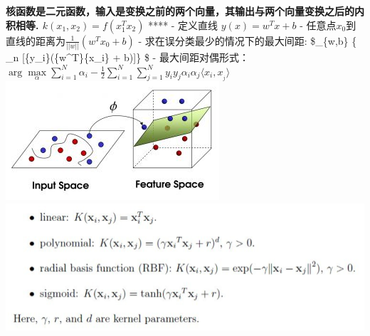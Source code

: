 \documentclass[11pt]{article}
\makeatletter
\def\maxwidth{\ifdim\Gin@nat@width>\linewidth\linewidth
    \else\Gin@nat@width\fi}
\let\Oldincludegraphics\includegraphics
\renewcommand{\includegraphics}[1]{\Oldincludegraphics[width=.8\maxwidth]{#1}}
\makeatother
\begin{document}
\textbf{核函数是二元函数，输入是变换之前的两个向量，其输出与两个向量变换之后的内积相等.
\(k({x_1},{x_2}) = f(x_1^T{x_2})\) } **** - 定义直线
\(y(x) = {w^T}x + b\) -
任意点\({x_0}\)到直线的距离为\(\frac{1}{{||w||}}({w^T}{x_0} + b)\) -
求在误分类最少的情况下的最大间距: \$\arg \mathop {\max }\limits\_\{w,b\}
\{ \mathop {\min }\limits\_n
{[}\{y\_i\}(\{w\^{}T\}\{x\_i\} + b){]}\} \$ -
最大间距对偶形式：\(\arg \mathop {\max }\limits_\alpha \sum\limits_{i = 1}^N {{\alpha _i} - \frac{1}{2}\sum\limits_{i = 1}^N {\sum\limits_{j = 1}^N {{y_i}{y_j}} } } {\alpha _i}{\alpha _j}\langle {x_i},{x_{_j}}\rangle\)
\includegraphics{svm_kernel.jpg} \includegraphics{核函数.png}
\end{document}
